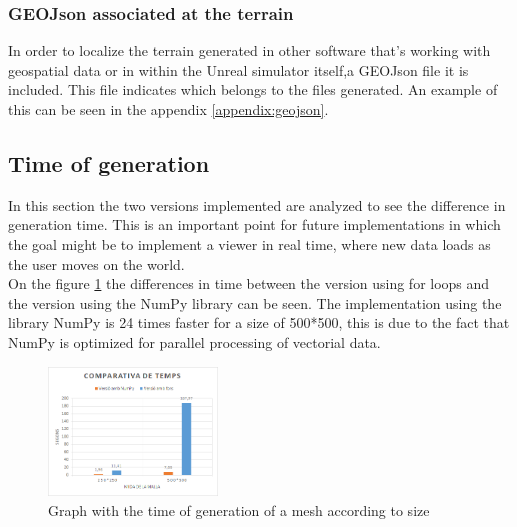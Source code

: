 \documentclass[10pt,a4paper,twocolumn,twoside]{article}
\begin{document}
\subsubsection{GEOJson associated at the terrain}

In order to localize the terrain generated in other software that's working with geospatial data or in within the Unreal simulator itself,a GEOJson file it is included. This file indicates which belongs to the files generated. An example of this can be seen in the appendix \ref{appendix:geojson}.

\subsection{Time of generation}
In this section the two versions implemented are analyzed to see the difference in generation time. This is an important point for future implementations in which the goal might be to implement a viewer in real time, where new data loads as the user moves on the world.
\\
On the figure \ref{fig-meshtime} the differences in time between the version using for loops and the version using the NumPy library can be seen. The implementation using the library NumPy is 24 times faster for a size of 500*500, this is due to the fact that NumPy is optimized for parallel processing of vectorial data.

\begin{figure}[!h]
\centering
  	\includegraphics[width=0.4\textwidth]{meshtime}
	\caption{Graph with the time of generation of a mesh according to size}
	\label{fig-meshtime}
\end{figure}
\end{document}

